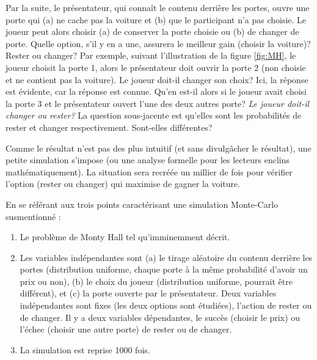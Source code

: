 \documentclass[
]{book}
\begin{document}
Par la suite, le présentateur, qui connaît le contenu derrière les portes, ouvre une porte qui (a) ne cache pas la voiture et (b) que le participant n'a pas choisie. Le joueur peut alors choisir (a) de conserver la porte choisie ou (b) de changer de porte. Quelle option, s'il y en a une, assurera le meilleur gain (choisir la voiture)? Rester ou changer? Par exemple, suivant l'illustration de la figure \ref{fig:MH}, le joueur choisit la porte 1, alors le présentateur doit ouvrir la porte 2 (non choisie et ne contient pas la voiture). Le joueur doit-il changer son choix? Ici, la réponse est évidente, car la réponse est connue. Qu'en est-il alors si le joueur avait choisi la porte 3 et le présentateur ouvert l'une des deux autres porte? \emph{Le joueur doit-il changer ou rester?} La question sous-jacente est qu'elles sont les probabilités de rester et changer respectivement. Sont-elles différentes?

Comme le résultat n'est pas des plus intuitif (et sans divulgâcher le résultat), une petite simulation s'impose (ou une analyse formelle pour les lecteurs enclins mathématiquement). La situation sera recréée un millier de fois pour vérifier l'option (rester ou changer) qui maximise de gagner la voiture.

En se référant aux trois points caractérisant une simulation Monte-Carlo susmentionné :

\begin{enumerate}
\def\labelenumi{\arabic{enumi}.}
\item
  Le problème de Monty Hall tel qu'imminemment décrit.
\item
  Les variables indépendantes sont (a) le tirage aléatoire du contenu derrière les portes (distribution uniforme, chaque porte à la même probabilité d'avoir un prix ou non), (b) le choix du joueur (distribution uniforme, pourrait être différent), et (c) la porte ouverte par le présentateur. Deux variables indépendantes sont fixes (les deux options sont étudiées), l'action de rester ou de changer. Il y a deux variables dépendantes, le succès (choisir le prix) ou l'échec (choisir une autre porte) de rester ou de changer.
\item
  La simulation est reprise 1000 fois.
\end{enumerate}
\end{document}
